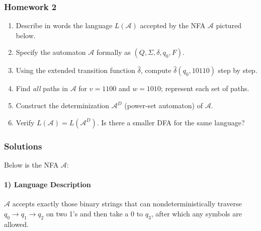 \documentclass{article}
\theoremstyle{theorem}
\theoremstyle{definition}
\theoremstyle{remark}
\begin{document}
\subsubsection{Homework 2}
\begin{enumerate}
  \item Describe in words the language \(L(\mathcal{A})\) accepted by the NFA \(\mathcal{A}\) pictured below.
  \item Specify the automaton \(\mathcal{A}\) formally as \((Q,\Sigma,\delta,q_0,F)\).
  \item Using the extended transition function \(\hat{\delta}\), compute \(\hat{\delta}(q_0,10110)\) step by step.
  \item Find \emph{all} paths in \(\mathcal{A}\) for \(v=1100\) and \(w=1010\); represent each set of paths.
  \item Construct the determinization \(\mathcal{A}^D\) (power-set automaton) of \(\mathcal{A}\).
  \item Verify \(L(\mathcal{A}) = L(\mathcal{A}^D)\). Is there a smaller DFA for the same language?
\end{enumerate}

\subsubsection*{Solutions}
Below is the NFA \(\mathcal{A}\):

\begin{center}
\end{center}

\paragraph{1) Language Description}  
\(\mathcal{A}\) accepts exactly those binary strings that can nondeterministically traverse  
\(q_0\to q_1\to q_2\) on two 1’s and then take a 0 to \(q_3\), after which any symbols are allowed.
\end{document}
